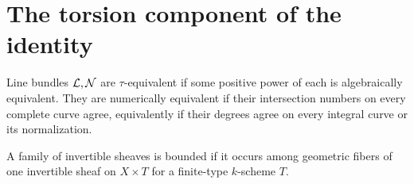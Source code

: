 \section{The torsion component of the identity}\label{kps-sec-pictau}

\begin{definition}\label{kps-def-numerical}
Line bundles $\mathcal L,\mathcal N$ are $\tau$-equivalent if some positive power of each
is algebraically equivalent. They are numerically equivalent if their
intersection numbers on every complete curve agree, equivalently if their
degrees agree on every integral curve or its normalization.
\end{definition}
\begin{definition}\label{kps-def-bounded-family}
A family of invertible sheaves is bounded if it occurs among geometric fibers
of one invertible sheaf on $X\times T$ for a finite-type $k$-scheme $T$.
\end{definition}

